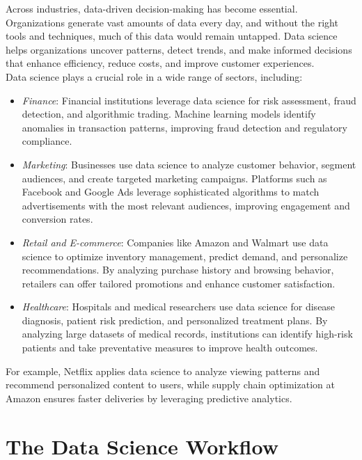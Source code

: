 \documentclass[
  11pt,
]{book}
\providecommand{\tightlist}{%
  \setlength{\itemsep}{0pt}\setlength{\parskip}{0pt}}
\theoremstyle{definition}
\theoremstyle{definition}
\theoremstyle{definition}
\theoremstyle{definition}
\theoremstyle{remark}
\begin{document}
Across industries, data-driven decision-making has become essential. Organizations generate vast amounts of data every day, and without the right tools and techniques, much of this data would remain untapped. Data science helps organizations uncover patterns, detect trends, and make informed decisions that enhance efficiency, reduce costs, and improve customer experiences.\\
Data science plays a crucial role in a wide range of sectors, including:

\begin{itemize}
\tightlist
\item
  \emph{Finance}: Financial institutions leverage data science for risk assessment, fraud detection, and algorithmic trading. Machine learning models identify anomalies in transaction patterns, improving fraud detection and regulatory compliance.\\
\item
  \emph{Marketing}: Businesses use data science to analyze customer behavior, segment audiences, and create targeted marketing campaigns. Platforms such as Facebook and Google Ads leverage sophisticated algorithms to match advertisements with the most relevant audiences, improving engagement and conversion rates.\\
\item
  \emph{Retail and E-commerce}: Companies like Amazon and Walmart use data science to optimize inventory management, predict demand, and personalize recommendations. By analyzing purchase history and browsing behavior, retailers can offer tailored promotions and enhance customer satisfaction.\\
\item
  \emph{Healthcare}: Hospitals and medical researchers use data science for disease diagnosis, patient risk prediction, and personalized treatment plans. By analyzing large datasets of medical records, institutions can identify high-risk patients and take preventative measures to improve health outcomes.
\end{itemize}

For example, Netflix applies data science to analyze viewing patterns and recommend personalized content to users, while supply chain optimization at Amazon ensures faster deliveries by leveraging predictive analytics.

\section{The Data Science Workflow}\label{the-data-science-workflow}
\end{document}
